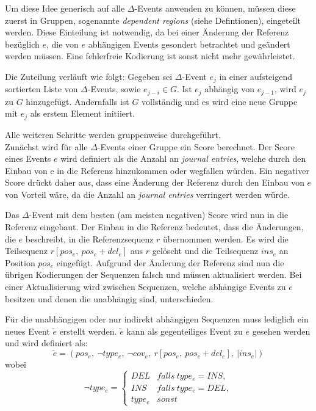 \documentclass[12pt]{article}
\begin{document}
Um diese Idee generisch auf alle $\Delta$-Events anwenden zu können, müssen diese zuerst in Gruppen, sogenannte \emph{dependent regions} (siehe Defintionen), eingeteilt werden. Diese Einteilung ist notwendig, da bei einer Änderung der Referenz bezüglich $e$, die von $e$ abhängigen Events gesondert betrachtet und geändert werden müssen. Eine fehlerfreie Kodierung ist sonst nicht mehr gewährleistet.

Die Zuteilung verläuft wie folgt: Gegeben sei $\Delta$-Event $e_{j}$ in einer aufsteigend sortierten Liste von $\Delta$-Events, sowie $e_{j-i} \in G$. Ist $e_{j}$ abhängig von $e_{j-1}$, wird $e_{j}$ zu $G$ hinzugefügt. Andernfalls ist $G$ vollständig und es wird eine neue Gruppe mit $e_{j}$ als erstem Element initiiert.

Alle weiteren Schritte werden gruppenweise durchgeführt.\\

Zunächst wird für alle $\Delta$-Events einer Gruppe ein Score berechnet. Der Score eines Events $e$ wird definiert als die Anzahl an \textit{journal entries}, welche durch den Einbau von e in die Referenz hinzukommen oder wegfallen würden. Ein negativer Score drückt daher aus, dass eine Änderung der Referenz durch den Einbau von $e$ von Vorteil wäre, da die Anzahl an \textit{journal entries} verringert werden würde.

Das $\Delta$-Event mit dem besten (am meisten negativen) Score wird nun in die Referenz eingebaut. Der Einbau in die Referenz bedeutet, dass die Änderungen, die $e$ beschreibt, in die Referenzsequenz $r$ übernommen werden. Es wird die Teilsequenz $r[pos_{e},~pos_{e}+del_{e}]$ aus $r$ gelöscht und die Teilsequenz $ins_{e}$ an Position $pos_{e}$ eingefügt. Aufgrund der Änderung der Referenz sind nun die übrigen Kodierungen der Sequenzen falsch und müssen aktualisiert werden. Bei einer Aktualisierung wird zwischen Sequenzen, welche abhängige Events zu $e$ besitzen und denen die unabhängig sind, unterschieden. 

Für die unabhängigen oder nur indirekt abhängigen Sequenzen muss lediglich ein neues Event $\tilde{e}$ erstellt werden. $\tilde{e}$ kann als gegenteiliges Event zu $e$ gesehen werden und wird definiert als:
\begin{equation}
\tilde{e} = (pos_{e},~\neg type_{e},~\neg cov_{e},~r[pos_{e},~pos_{e}+del_{e}],~|ins_{e}|)
\end{equation}
wobei
\begin{equation}
\neg type_{e} =
\begin{cases}
DEL & falls~ type_{e} = INS, \\
INS & falls~ type_{e} = DEL, \\
type_{e} & sonst
\end{cases}
\end{equation}
\\
\end{document}
